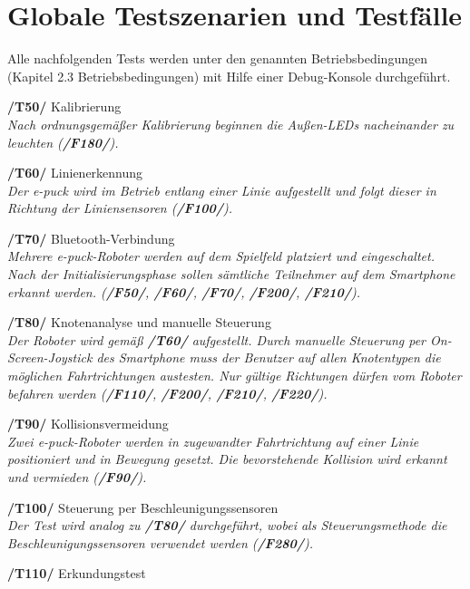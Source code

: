 \documentclass[10pt,a4paper]{article}
\let\oldsection\section
\renewcommand{\section}{\newpage \oldsection}
\begin{document}
	\section{Globale Testszenarien und Testfälle}	
		Alle nachfolgenden Tests werden unter den genannten Betriebsbedingungen (Kapitel 2.3 Betriebsbedingungen)
		mit Hilfe einer Debug-Konsole durchgeführt.
			\begin{list}{}{\leftmargin=1cm}
				\item[\textbf{/T50/}] Kalibrierung
					\\ \textsl{Nach ordnungsgemäßer Kalibrierung beginnen die Außen-LEDs nacheinander zu leuchten (\textbf{/F180/}).}
				\item[\textbf{/T60/}] Linienerkennung
					\\ \textsl{Der e-puck wird im Betrieb entlang einer Linie aufgestellt und folgt dieser in Richtung der
						Liniensensoren (\textbf{/F100/}).}		
				\item[\textbf{/T70/}] Bluetooth-Verbindung
					\\ \textsl{Mehrere e-puck-Roboter werden auf dem Spielfeld platziert und eingeschaltet. Nach der Initialisierungsphase
						sollen sämtliche Teilnehmer auf dem Smartphone erkannt werden. (\textbf{/F50/}, \textbf{/F60/}, \textbf{/F70/}, 
						\textbf{/F200/}, \textbf{/F210/}).}								
				\item[\textbf{/T80/}] Knotenanalyse und manuelle Steuerung
					\\ \textsl{Der Roboter wird gemäß \textbf{/T60/} aufgestellt. Durch manuelle Steuerung per On-Screen-Joystick des
						Smartphone muss der Benutzer 	auf allen Knotentypen die möglichen Fahrtrichtungen austesten. Nur gültige Richtungen
						dürfen vom Roboter befahren werden (\textbf{/F110/},	\textbf{/F200/}, \textbf{/F210/}, \textbf{/F220/}).}							
				\item[\textbf{/T90/}] Kollisionsvermeidung
					\\ \textsl{Zwei e-puck-Roboter werden in zugewandter Fahrtrichtung auf einer Linie positioniert und in Bewegung gesetzt.
						Die bevorstehende Kollision wird erkannt und vermieden (\textbf{/F90/}).}		
				\item[\textbf{/T100/}] Steuerung per Beschleunigungssensoren
					\\ \textsl{Der Test wird analog zu \textbf{/T80/} durchgeführt, wobei als Steuerungsmethode die Beschleunigungssensoren
						verwendet werden (\textbf{/F280/}).}
				\item[\textbf{/T110/}] Erkundungstest

\end{list}
\end{document}
